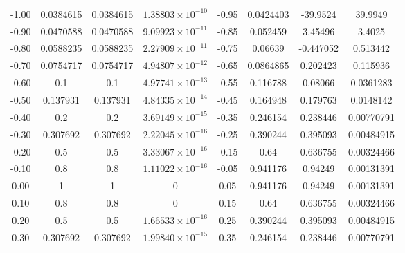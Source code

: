 \documentclass[a4paper]{book}
\begin{document}
\begin{enumerate}
\bigskip
\begin{center}
    \tabletail{\hline}
    \tablelasttail{\hline}
    \begin{supertabular}{|cccc|cccc|}
        -1.00 & 0.0384615 & 0.0384615 & $1.38803\times10^{-10}$ & -0.95 & 0.0424403 & -39.9524  & 39.9949    \\
        -0.90 & 0.0470588 & 0.0470588 & $9.09923\times10^{-11}$ & -0.85 & 0.052459  & 3.45496   & 3.4025     \\
        -0.80 & 0.0588235 & 0.0588235 & $2.27909\times10^{-11}$ & -0.75 & 0.06639   & -0.447052 & 0.513442   \\
        -0.70 & 0.0754717 & 0.0754717 & $4.94807\times10^{-12}$ & -0.65 & 0.0864865 & 0.202423  & 0.115936   \\
        -0.60 & 0.1       & 0.1       & $4.97741\times10^{-13}$ & -0.55 & 0.116788  & 0.08066   & 0.0361283  \\
        -0.50 & 0.137931  & 0.137931  & $4.84335\times10^{-14}$ & -0.45 & 0.164948  & 0.179763  & 0.0148142  \\
        -0.40 & 0.2       & 0.2       & $3.69149\times10^{-15}$ & -0.35 & 0.246154  & 0.238446  & 0.00770791 \\
        -0.30 & 0.307692  & 0.307692  & $2.22045\times10^{-16}$ & -0.25 & 0.390244  & 0.395093  & 0.00484915 \\
        -0.20 & 0.5       & 0.5       & $3.33067\times10^{-16}$ & -0.15 & 0.64      & 0.636755  & 0.00324466 \\
        -0.10 & 0.8       & 0.8       & $1.11022\times10^{-16}$ & -0.05 & 0.941176  & 0.94249   & 0.00131391 \\
        0.00  & 1         & 1         & 0                       & 0.05  & 0.941176  & 0.94249   & 0.00131391 \\
        0.10  & 0.8       & 0.8       & 0                       & 0.15  & 0.64      & 0.636755  & 0.00324466 \\
        0.20  & 0.5       & 0.5       & $1.66533\times10^{-16}$ & 0.25  & 0.390244  & 0.395093  & 0.00484915 \\
        0.30  & 0.307692  & 0.307692  & $1.99840\times10^{-15}$ & 0.35  & 0.246154  & 0.238446  & 0.00770791 \\

\end{supertabular}
\end{center}
\end{enumerate}
\end{document}
